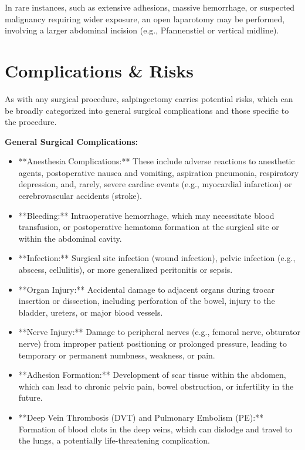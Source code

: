 In rare instances, such as extensive adhesions, massive hemorrhage, or suspected malignancy requiring wider exposure, an open laparotomy may be performed, involving a larger abdominal incision (e.g., Pfannenstiel or vertical midline).

\section*{Complications \& Risks}
As with any surgical procedure, salpingectomy carries potential risks, which can be broadly categorized into general surgical complications and those specific to the procedure.

\textbf{General Surgical Complications:}
\begin{itemize}
  \item **Anesthesia Complications:** These include adverse reactions to anesthetic agents, postoperative nausea and vomiting, aspiration pneumonia, respiratory depression, and, rarely, severe cardiac events (e.g., myocardial infarction) or cerebrovascular accidents (stroke).
  \item **Bleeding:** Intraoperative hemorrhage, which may necessitate blood transfusion, or postoperative hematoma formation at the surgical site or within the abdominal cavity.
  \item **Infection:** Surgical site infection (wound infection), pelvic infection (e.g., abscess, cellulitis), or more generalized peritonitis or sepsis.
  \item **Organ Injury:** Accidental damage to adjacent organs during trocar insertion or dissection, including perforation of the bowel, injury to the bladder, ureters, or major blood vessels.
  \item **Nerve Injury:** Damage to peripheral nerves (e.g., femoral nerve, obturator nerve) from improper patient positioning or prolonged pressure, leading to temporary or permanent numbness, weakness, or pain.
  \item **Adhesion Formation:** Development of scar tissue within the abdomen, which can lead to chronic pelvic pain, bowel obstruction, or infertility in the future.
  \item **Deep Vein Thrombosis (DVT) and Pulmonary Embolism (PE):** Formation of blood clots in the deep veins, which can dislodge and travel to the lungs, a potentially life-threatening complication.
\end{itemize}

